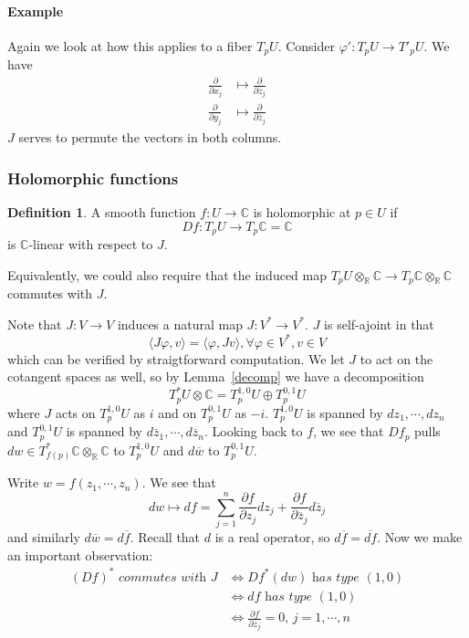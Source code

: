 \documentclass[12pt]{article}
\theoremstyle{plain}
\theoremstyle{definition}
\newtheorem{definition}[equation]{Definition}
\newcommand{\IC}{\mathbb{C}}
\newcommand{\IR}{\mathbb{R}}
\newcommand\tensor{{\otimes}}
\newcommand{\<}{\langle}
\renewcommand{\>}{\rangle}
\newcommand{\p}{\partial}
\newcommand{\bz}{\overline{z}}
\newcommand{\bw}{\overline{w}}
\newcommand{\ddzj}{\frac{\p}{\p z_j}}
\newcommand{\ddbzj}{\frac{\p}{\p \bz_j}}
\newcommand{\ddxj}{\frac{\p}{\p x_j}}
\newcommand{\ddyj}{\frac{\p}{\p y_j}}
\begin{document}
\paragraph{Example} Again we look at how this applies to a fiber $T_p U$. Consider $\varphi' : T_p U \to T'_p U$. We have 
\begin{align*}
\ddxj &\mapsto \ddzj \\
\ddyj &\mapsto \ddbzj 
\end{align*}
$J$ serves to permute the vectors in both columns. 

\subsubsection{Holomorphic functions}
\begin{definition}
A smooth function $f : U \to \IC$ is holomorphic at $p \in U$ if 
$$ Df : T_p U \to T_p \IC = \IC $$
is $\IC$-linear with respect to $J$. 
\end{definition}
Equivalently, we could also require that the induced map $T_p U \tensor_\IR \IC \to T_p \IC \tensor_\IR \IC$ commutes with $J$. 

Note that $J : V \to V$ induces a natural map $J : V^* \to V^*$. $J$ is self-ajoint in that 
$$ \< J \varphi , v \> = \< \varphi, J v \>, \forall \varphi \in V^*, v \in V $$
which can be verified by straigtforward computation. We let $J$ to act on the cotangent spaces as well, so by Lemma~\ref{decomp} we have a decomposition
$$ T^*_p U \tensor \IC = T^{1, 0}_p U \oplus T^{0, 1}_p U $$
where $J$ acts on $T^{1, 0}_p U$ as $i$ and on $T^{0, 1}_p U$ as $-i$. $T^{1, 0}_p U$ is spanned by $dz_1, \cdots, dz_n$ and $T^{0, 1}_p U$ is spanned by $d\bz_1, \cdots, d\bz_n$. 
Looking back to $f$, we see that $Df_p$ pulls $dw \in T_{f(p)}^* \IC \tensor_\IR \IC$ to $T^{1, 0}_p U$ and $d\bw$ to $T^{0, 1}_p U$. 

Write $w = f(z_1, \cdots, z_n)$. We see that 
$$
dw \mapsto df = \sum_{j = 1}^n \frac{\p f}{\p z_j} dz_j + \frac{\p f}{\p \bz_j} d\bz_j
$$  
and similarly $d \bw = d \overline{f}$. Recall that $d$ is a real operator, so $d \overline{f} = \overline{df}$. Now we make an important observation: 
\begin{align*}
(Df)^* \textit{ commutes with } J &\iff Df^*(dw) \textit{ has type }(1, 0)\\
&\iff df \textit{ has type }(1, 0) \\
&\iff \frac{\p f}{\p \bz_j} = 0, \, j = 1, \cdots, n
\end{align*}
\end{document}
